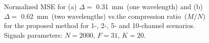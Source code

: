 \documentclass{article}
\theoremstyle{definition}
\begin{document}
\begin{figure}[htb]
	\hfill%
	\hfill%
	\hfill%
	\caption{Normalized MSE for (a) $\Delta = $ \SI{0.31}{\milli\metre}~(one wavelength) and (b) $\Delta = $ \SI{0.62}{\milli\metre}~(two wavelengths) vs.\@ the compression ratio~($M/N$) for the proposed method for \num{1}-, \num{2}-, \num{5}- and \num{10}-channel scenarios. Signals parameters: $N=2000$, $F=31$, $K=20$.}
	\label{fig_synth_US}
\end{figure}
\end{document}
